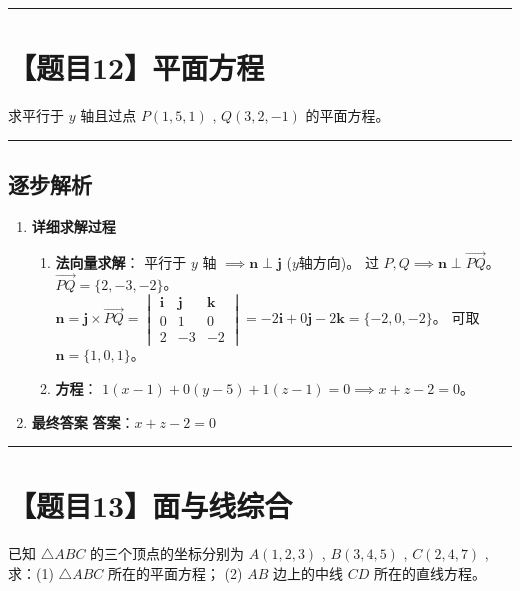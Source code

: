 \documentclass[UTF8]{ctexart}
\newenvironment{redenv}{\color{red}}{}
\newenvironment{detailedanalysis}{%
    \color{red}
    \begin{enumerate}[label=\textbf{第\arabic*步：}, leftmargin=*, align=left, itemsep=1.5ex]
}{%
    \end{enumerate}
}
\newcommand{\problemrule}{\noindent\rule{\textwidth}{1.5pt}\vspace{-0.8em}}
\newcommand{\analysisrule}{\noindent\rule{\textwidth}{0.8pt}\vspace{-0.8em}}
\begin{document}
\problemrule
\section*{【题目12】平面方程}
求平行于 $y$ 轴且过点 $ P(1,5,1) $ , $ Q(3,2,-1) $ 的平面方程。

\begin{redenv}
\analysisrule
\subsection*{逐步解析}

\begin{detailedanalysis}
\item \textbf{详细求解过程}
\begin{enumerate}[label=(\arabic*)]
\item \textbf{法向量求解}：
平行于 $y$ 轴 $\implies \mathbf{n} \perp \mathbf{j}$ ($y$轴方向)。
过 $P, Q \implies \mathbf{n} \perp \overrightarrow{PQ}$。
$\overrightarrow{PQ} = \{2, -3, -2\}$。
$\mathbf{n} = \mathbf{j} \times \overrightarrow{PQ} = \begin{vmatrix} \mathbf{i} & \mathbf{j} & \mathbf{k} \\ 0 & 1 & 0 \\ 2 & -3 & -2 \end{vmatrix} = -2\mathbf{i} + 0\mathbf{j} - 2\mathbf{k} = \{-2, 0, -2\}$。
可取 $\mathbf{n} = \{1, 0, 1\}$。
\item \textbf{方程}：
$1(x-1) + 0(y-5) + 1(z-1) = 0 \implies x + z - 2 = 0$。
\end{enumerate}

\item \textbf{最终答案}
\textbf{答案}：$ x+z-2=0 $
\end{detailedanalysis}
\end{redenv}

\problemrule
\section*{【题目13】面与线综合}
已知 $ \triangle ABC $ 的三个顶点的坐标分别为 $ A(1,2,3) $ , $ B(3,4,5) $ , $ C(2,4,7) $ ,
求：(1) $ \triangle ABC $ 所在的平面方程；
(2) $AB$ 边上的中线 $CD$ 所在的直线方程。
\end{document}
